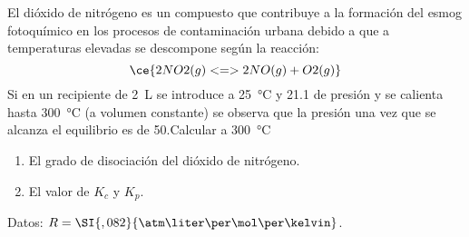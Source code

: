 El dióxido de nitrógeno es un compuesto que contribuye a la formación del esmog fotoquímico en los procesos de contaminación urbana debido a que a temperaturas elevadas se descompone según la reacción:
$$
    \ce{2NO2(g) <=> 2NO(g)+O2(g)}
$$
Si en un recipiente de \SI{2}{\liter} se introduce  a \SI{25}{\celsius} y \SI{21,1}{\atm} de presión y se calienta hasta \SI{300}{\celsius} (a volumen constante) se observa que la presión una vez que se alcanza el equilibrio es de \SI{50}{\atm}.Calcular a \SI{300}{\celsius}
\begin{enumerate}[label={\alph*)},font=\bfseries]
    \item El grado de disociación del dióxido de nitrógeno.
    \item El valor de $K_c$ y $K_p$.
\end{enumerate}
Datos: $R = \SI{,082}{\atm\liter\per\mol\per\kelvin}$.
